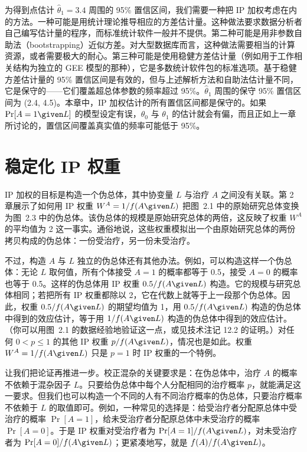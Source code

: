 为得到点估计 $\hat\theta_1=3.4$ 周围的 95\% 置信区间，我们需要一种把 IP 加权考虑在内的方法。一种可能是用统计理论推导相应的方差估计量。这种做法要求数据分析者自己编写估计量的程序，而标准统计软件一般并不提供。第二种可能是用非参数自助法（bootstrapping）近似方差。对大型数据库而言，这种做法需要相当的计算资源，或者需要极大的耐心。第三种可能是使用稳健方差估计量（例如用于工作相关结构为独立的 GEE 模型的那种），它是多数统计软件包的标准选项。基于稳健方差估计量的 95\% 置信区间是有效的，但与上述解析方法和自助法估计量不同，它是保守的——它们覆盖超总体参数的频率超过 95\%。$\hat\theta_1$ 周围的保守 95\% 置信区间为 (2.4, 4.5)。本章中，IP 加权估计的所有置信区间都是保守的。如果 $\Pr[A=1\given L]$ 的模型设定有误，$\theta_0$ 与 $\theta_1$ 的估计就会有偏，而且正如上一章所讨论的，置信区间覆盖真实值的频率可能低于 95\%。

\section{稳定化 IP 权重}

IP 加权的目标是构造一个伪总体，其中协变量 $L$ 与治疗 $A$ 之间没有关联。第 2 章展示了如何用 IP 权重 $W^{A}=1/f(A\given L)$ 把图~2.1 中的原始研究总体变换为图~2.3 中的伪总体。该伪总体的规模是原始研究总体的两倍，这反映了权重 $W^{A}$ 的平均值为 2 这一事实。通俗地说，这些权重模拟出一个由原始研究总体的两份拷贝构成的伪总体：一份受治疗，另一份未受治疗。

不过，构造 $A$ 与 $L$ 独立的伪总体还有其他办法。例如，可以构造这样一个伪总体：无论 $L$ 取何值，所有个体接受 $A=1$ 的概率都等于 0.5，接受 $A=0$ 的概率也等于 0.5。这样的伪总体用 IP 权重 $0.5/f(A\given L)$ 构造。它的规模与研究总体相同；若把所有 IP 权重都除以 2，它在代数上就等于上一段那个伪总体。因此，权重 $0.5/f(A\given L)$ 的期望均值为 1，用 $0.5/f(A\given L)$ 构造的伪总体中得到的效应估计，等于用 $1/f(A\given L)$ 构造的伪总体中得到的效应估计。（你可以用图~2.1 的数据经验地验证这一点，或见技术注记 12.2 的证明。）对任何 $0<p\le 1$ 的其他 IP 权重 $p/f(A\given L)$，情况也是如此。权重 $W^{A}=1/f(A\given L)$ 只是 $p=1$ 时 IP 权重的一个特例。

让我们把论证再推进一步。校正混杂的关键要求是：在伪总体中，治疗 $A$ 的概率不依赖于混杂因子 $L$。只要给伪总体中每个人分配相同的治疗概率 $p$，就能满足这一要求。但我们也可以构造一个不同的人有不同治疗概率的伪总体，只要治疗概率不依赖于 $L$ 的取值即可。例如，一种常见的选择是：给受治疗者分配原总体中受治疗的概率 $\Pr[A=1]$，给未受治疗者分配原总体中未受治疗的概率 $\Pr[A=0]$。于是 IP 权重对受治疗者为 $\Pr[A=1]/f(A\given L)$，对未受治疗者为 $\Pr[A=0]/f(A\given L)$；更紧凑地写，就是 $f(A)/f(A\given L)$。

